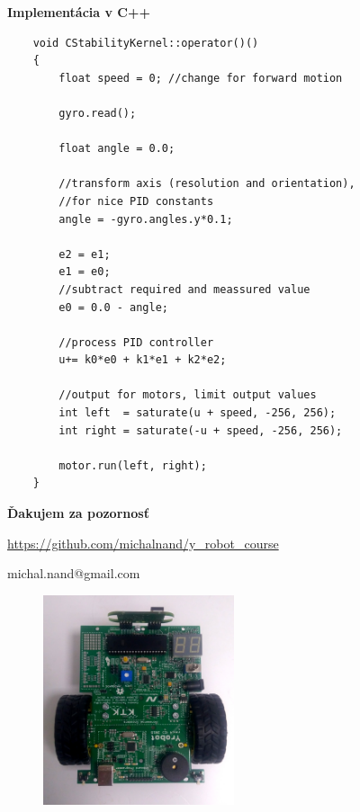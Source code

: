 \documentclass[xcolor=dvipsnames]{beamer}
\begin{document}
\begin{frame}[fragile]{\bf Implementácia v C++}
    \begin{lstlisting}
    void CStabilityKernel::operator()()
    {
        float speed = 0; //change for forward motion

        gyro.read();

        float angle = 0.0;

        //transform axis (resolution and orientation),
        //for nice PID constants
        angle = -gyro.angles.y*0.1;

        e2 = e1;
        e1 = e0;
        //subtract required and meassured value
        e0 = 0.0 - angle;

        //process PID controller
        u+= k0*e0 + k1*e1 + k2*e2;

        //output for motors, limit output values
        int left  = saturate(u + speed, -256, 256);
        int right = saturate(-u + speed, -256, 256);

        motor.run(left, right);
    }
    \end{lstlisting}
\end{frame}


\begin{frame}{\bf Ďakujem za pozornosť}

\url {https://github.com/michalnand/y_robot_course}
\centerline{michal.nand@gmail.com}


\begin{figure}[ht]
\begin{center}
\begin{minipage}{0.8\linewidth}
\begin{center}
\includegraphics[width=0.5\textwidth]{robot.jpg}
\end{center}
\end{minipage}
\end{center}
\end{figure}

\end{frame}
\end{document}
